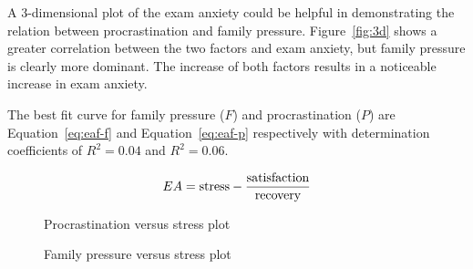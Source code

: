 \documentclass[12pt]{report}
\begin{document}
\begin{multicols}{2}
A 3-dimensional plot of the exam anxiety could be helpful in demonstrating
the relation between procrastination and family pressure. Figure~\ref{fig:3d}
shows a greater correlation between the two factors and exam anxiety, but family
pressure is clearly more dominant. The increase of both factors results in a
noticeable increase in exam anxiety.

The best fit curve for family pressure ($F$) and procrastination ($P$) are
Equation~\ref{eq:eaf-f} and Equation~\ref{eq:eaf-p} respectively with
determination coefficients of $R^2 = 0.04$ and $R^2 = 0.06$.

\begin{equation}
    EA = \textnormal{stress} -
    \frac{\textnormal{satisfaction}}{\textnormal{recovery}}
    \label{eq:exam-anxiety}
\end{equation}

\begin{figure}[H]
    \caption{Procrastination versus stress plot}
    \label{fig:procrastination-stress}
\end{figure}

\begin{figure}[H]
    \caption{Family pressure versus stress plot}
    \label{fig:family-stress}
\end{figure}


\end{multicols}
\end{document}
